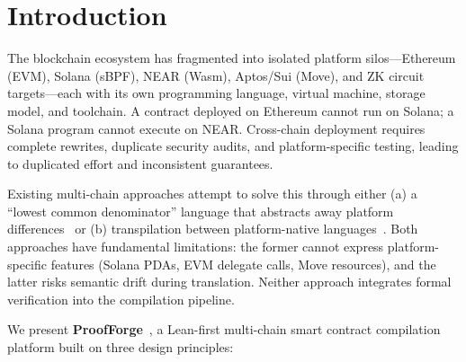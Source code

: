 \documentclass[sigconf]{acmart}
\begin{document}



\maketitle

\section{Introduction}

The blockchain ecosystem has fragmented into isolated platform silos---Ethereum (EVM), Solana
(sBPF), NEAR (Wasm), Aptos/Sui (Move), and ZK circuit targets---each with its own programming
language, virtual machine, storage model, and toolchain. A contract deployed on Ethereum
cannot run on Solana; a Solana program cannot execute on NEAR. Cross-chain deployment requires
complete rewrites, duplicate security audits, and platform-specific testing, leading to
duplicated effort and inconsistent guarantees.

Existing multi-chain approaches attempt to solve this through either (a) a ``lowest common
denominator'' language that abstracts away platform differences~\cite{reach} or (b) transpilation
between platform-native languages~\cite{solang}. Both approaches have fundamental limitations:
the former cannot express platform-specific features (Solana PDAs, EVM delegate calls, Move
resources), and the latter risks semantic drift during translation. Neither approach integrates
formal verification into the compilation pipeline.

We present \textbf{ProofForge}~\cite{proofforge}, a Lean-first multi-chain smart contract
compilation platform built on three design principles:
\end{document}
